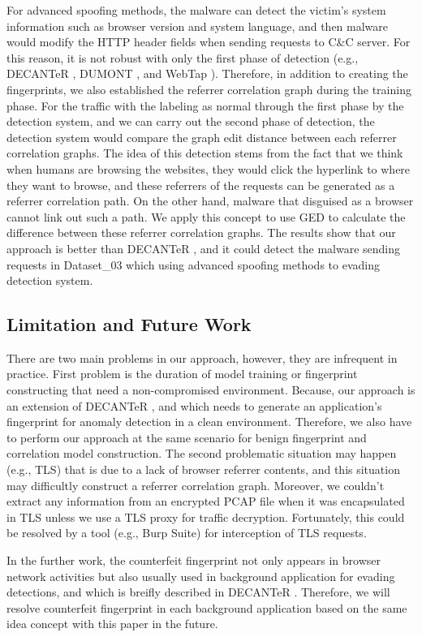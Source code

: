 For advanced spoofing methods, the malware can detect the victim's system information such as browser version and system language, and then malware would modify the HTTP header fields when sending requests to C\&C server. For this reason, it is not robust with only the first phase of detection (e.g., DECANTeR \cite{bortolameotti2017decanter}, DUMONT \cite{schwenk2011adaptive}, and WebTap \cite{borders2004web}). Therefore, in addition to creating the fingerprints, we also established the referrer correlation graph during the training phase. For the traffic with the labeling as normal through the first phase by the detection system, and we can carry out the second phase of detection, the detection system would compare the graph edit distance between each referrer correlation graphs. The idea of this detection stems from the fact that we think when humans are browsing the websites, they would click the hyperlink to where they want to browse, and these referrers of the requests can be generated as a referrer correlation path. On the other hand, malware that disguised as a browser cannot link out such a path. We apply this concept to use GED to calculate the difference between these referrer correlation graphs. The results show that our approach is better than DECANTeR \cite{bortolameotti2017decanter}, and it could detect the malware sending requests in Dataset\_03 which using advanced spoofing methods to evading detection system.

\subsection{Limitation and Future Work}

There are two main problems in our approach, however, they are infrequent in practice. First problem is the duration of model training or fingerprint constructing that need a non-compromised environment. Because, our approach is an extension of DECANTeR \cite{bortolameotti2017decanter}, and which needs to generate an application's fingerprint for anomaly detection in a clean environment. Therefore, we also have to perform our approach at the same scenario for benign fingerprint and correlation model construction. The second problematic situation may happen (e.g., TLS) that is due to a lack of browser referrer contents, and this situation may difficultly construct a referrer correlation graph. Moreover, we couldn't extract any information from an encrypted PCAP file when it was encapsulated in TLS unless we use a TLS proxy for traffic decryption. Fortunately, this could be resolved by a tool (e.g., Burp Suite) for interception of TLS requests. 

In the further work, the counterfeit fingerprint not only appears in browser network activities but also usually used in background application for evading detections, and which is breifly described in DECANTeR \cite{bortolameotti2017decanter}. Therefore, we will resolve counterfeit fingerprint in each background application based on the same idea concept with this paper in the future.

